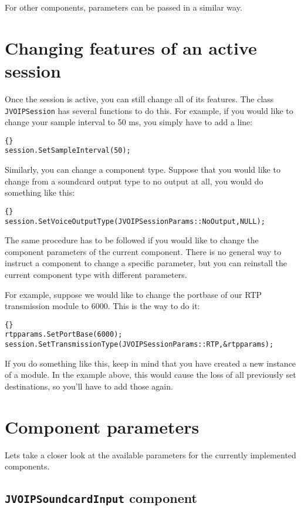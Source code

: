	For other components, parameters can be passed in a similar way.
	
	\section{Changing features of an active session}
	
	Once the session is active, you can still change all of its features. The
	class {\tt JVOIPSession} has several functions to do this. For example, if
	you would like to change your sample interval to 50 ms, you simply have
	to add a line:
	\begin{lstlisting}[frame=tb]{}
session.SetSampleInterval(50);
	\end{lstlisting}
	
	Similarly, you can change a component type. Suppose that you would like to
	change from a soundcard output type to no output at all, you would do
	something like this:
	\begin{lstlisting}[frame=tb]{}
session.SetVoiceOutputType(JVOIPSessionParams::NoOutput,NULL);
	\end{lstlisting}
	
	The same procedure has to be followed if you would like to change the
	component parameters of the current component. There is no general way
	to instruct a component to change a specific parameter, but you can
	reinstall the current component type with different parameters.
	
	For example, suppose we would like to change the portbase of our RTP
	transmission module to 6000. This is the way to do it:
	\begin{lstlisting}[frame=tb]{}
rtpparams.SetPortBase(6000);
session.SetTransmissionType(JVOIPSessionParams::RTP,&rtpparams);
	\end{lstlisting}
	If you do something like this, keep in mind that you have created a new
	instance of a module. In the example above, this would cause the loss
	of all previously set destinations, so you'll have to add those again.
	
	\section{Component parameters}
	
	Lets take a closer look at the available parameters for the currently
	implemented components.
	
		\subsection{{\tt JVOIPSoundcardInput} component}
		
